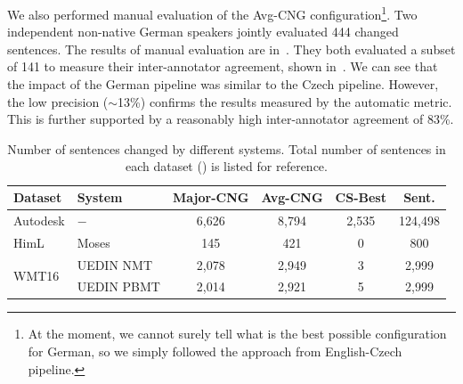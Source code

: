 \begin{table}[t]
\centering
\small
{}
\caption[Final German MLFix evaluation]{
    Final evaluation of the Englsh-German configuration of MLFix using BLUE metric.
	Values are multiplied by 100 for easier reading. Majority-CNG and Avg-CNG methods were compared
with the best English-Czech configuration.
}
\label{final_de-summary}
\end{table}

We also performed manual evaluation of the Avg-CNG configuration\footnote{At the moment, we cannot surely tell what is
the best possible configuration for German, so we simply followed the approach from English-Czech pipeline.}. Two
independent non-native German speakers jointly evaluated 444 changed sentences. The results of manual evaluation are in~.
They both evaluated a subset of 141 to measure their inter-annotator agreement, shown in~.
We can see that the impact of the German pipeline was similar to the Czech pipeline. However, the low precision ($\sim$13\%)
confirms the results measured by the automatic metric. This is further supported by a reasonably high inter-annotator agreement of 83\%.

\begin{table}[t]
\centering
\small

\begin{tabular}{|l|l||c|c|c||c|}
\hline
Dataset  &  System  &  Major-CNG  &  Avg-CNG  &  CS-Best  &  Sent.  \\
\hline
\hline
Autodesk  &  $-$  &  6,626  &  8,794  &  2,535  &  124,498  \\
\hline
HimL  &  Moses  &  145  &  421  &  0  &  800  \\
\hline
\multirow{2}{*}{WMT16}  &  UEDIN NMT  &  2,078  &  2,949  &  3  &  2,999  \\
&  UEDIN PBMT  &  2,014  &  2,921  &  5  &  2,999  \\
\hline
\end{tabular}

\caption[Final German MLFix evaluation - number of changed sentences]{
    Number of sentences changed by different systems. Total number of
sentences in each dataset () is listed for reference.
}   
\label{final_de-chgd}
\end{table}



